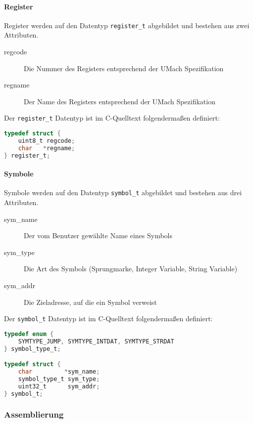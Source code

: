 \paragraph{Register} Register werden auf den Datentyp \texttt{register\_t}
abgebildet und bestehen aus zwei Attributen.

\begin{description}
    \item[regcode] Die Nummer des Registers entsprechend der UMach Spezifikation
    \item[regname] Der Name des Registers entsprechend der UMach Spezifikation
\end{description}

Der \texttt{register\_t} Datentyp ist im C-Quelltext folgendermaßen definiert:

\begin{lstlisting}[language=C]
typedef struct {
    uint8_t regcode;
    char   *regname;
} register_t;
\end{lstlisting}

\paragraph{Symbole} Symbole werden auf den Datentyp \texttt{symbol\_t}
abgebildet und bestehen aus drei Attributen.

\begin{description}
    \item[sym\_name] Der vom Benutzer gewählte Name eines Symbols
    \item[sym\_type] Die Art des Symbols (Sprungmarke, Integer Variable, String Variable)
    \item[sym\_addr] Die Zieladresse, auf die ein Symbol verweist
\end{description}

Der \texttt{symbol\_t} Datentyp ist im C-Quelltext folgendermaßen definiert:

\begin{lstlisting}[language=C]
typedef enum {
    SYMTYPE_JUMP, SYMTYPE_INTDAT, SYMTYPE_STRDAT
} symbol_type_t;

typedef struct {
    char         *sym_name;
    symbol_type_t sym_type;
    uint32_t      sym_addr;
} symbol_t;
\end{lstlisting}

\subsubsection{Assemblierung}

